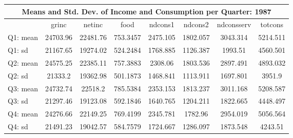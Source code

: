 \begin{tabular}{l*{7}{c}}
\hline\hline
\multicolumn{8}{c}{Means and Std. Dev. of Income and Consumption per Quarter: 1987}  \\
\hline    
            &       grinc&      netinc&        food&     ndcons1&     ndcons2&  ndconsserv&     totcons\\
\hline
Q1: mean          &    24703.96&    22481.76&    753.3457&    2475.105&    1802.057&    3043.314&    5214.511\\
Q1: sd        &    21167.65&    19274.02&    524.2484&    1768.885&    1126.387&     1993.51&    4560.501\\
Q2: mean       &    24575.25&    22385.11&    757.3883&     2308.06&    1803.536&    2897.491&    4893.032\\
Q2: sd        &     21333.2&    19362.98&    501.1873&    1468.841&    1113.911&    1697.801&      3951.9\\
Q3: mean       &    24732.74&     22518.2&    785.5384&    2353.153&    1813.237&    3011.168&    5208.587\\
Q3: sd        &    21297.46&    19123.08&    592.1846&    1640.765&    1204.211&    1822.665&    4448.497\\
Q4: mean        &    24276.66&    22149.25&    769.4199&    2345.781&     1782.96&    2954.019&    5056.564\\
Q4: sd        &    21491.23&    19042.57&    584.7579&    1724.667&    1286.097&    1873.548&     4243.51\\
\hline\hline
\end{tabular}
